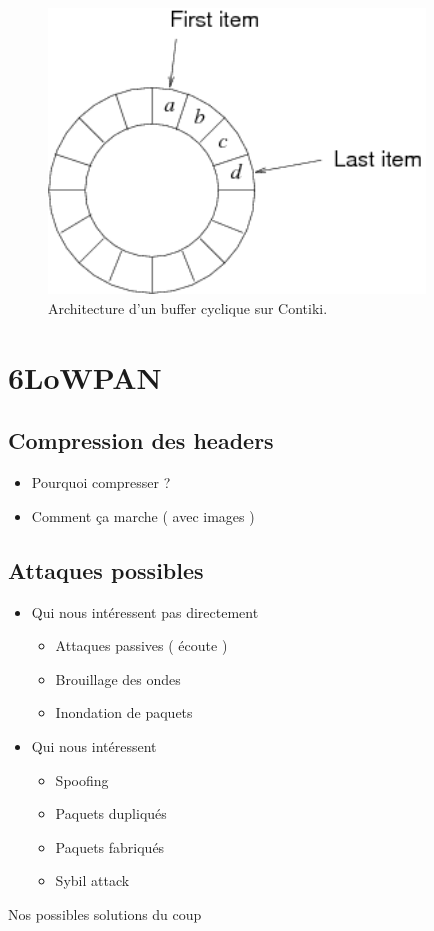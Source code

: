 				\begin{figure}[htp]
					\centering
					\includegraphics[width=10cm]{images/ringbuf}
					\caption{Architecture d'un buffer cyclique sur Contiki.}
					\label{fig:ringbuf}
				\end{figure}
		
	
\section{6LoWPAN}
	\subsection{Compression des headers}
		\begin{itemize}
			\item Pourquoi compresser ?
			\item Comment ça marche ( avec images )
		\end{itemize}
	
	
	\subsection{Attaques possibles}
	\begin{itemize}
		\item Qui nous intéressent pas directement
		\begin{itemize}
			\item Attaques passives ( écoute )
			\item Brouillage des ondes
			\item Inondation de paquets
		\end{itemize}
		\item Qui nous intéressent
		\begin{itemize}
			\item Spoofing
			\item Paquets dupliqués
			\item Paquets fabriqués
			\item Sybil attack
		\end{itemize}
	\end{itemize}
	Nos possibles solutions du coup


